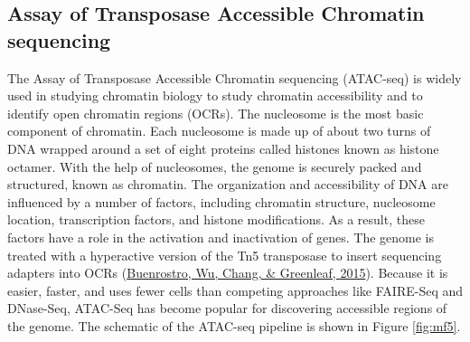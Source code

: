 \documentclass[12pt,twoside]{reedthesis}
\begin{document}
\hypertarget{m3.3}{%
\subsection*{Assay of Transposase Accessible Chromatin sequencing}\label{m3.3}}

The Assay of Transposase Accessible Chromatin sequencing (ATAC-seq) is
widely used in studying chromatin biology to study chromatin
accessibility and to identify open chromatin regions (OCRs). The
nucleosome is the most basic component of chromatin. Each nucleosome is
made up of about two turns of DNA wrapped around a set of eight proteins
called histones known as histone octamer. With the help of nucleosomes,
the genome is securely packed and structured, known as chromatin. The
organization and accessibility of DNA are influenced by a number of
factors, including chromatin structure, nucleosome location,
transcription factors, and histone modifications. As a result, these
factors have a role in the activation and inactivation of genes. The
genome is treated with a hyperactive version of the Tn5 transposase to
insert sequencing adapters into OCRs (\protect\hyperlink{ref-buenrostro2015}{Buenrostro, Wu, Chang, \& Greenleaf, 2015}). Because it is
easier, faster, and uses fewer cells than competing approaches like
FAIRE-Seq and DNase-Seq, ATAC-Seq has become popular for discovering
accessible regions of the genome. The schematic of the ATAC-seq pipeline
is shown in Figure \ref{fig:mf5}.
\end{document}
